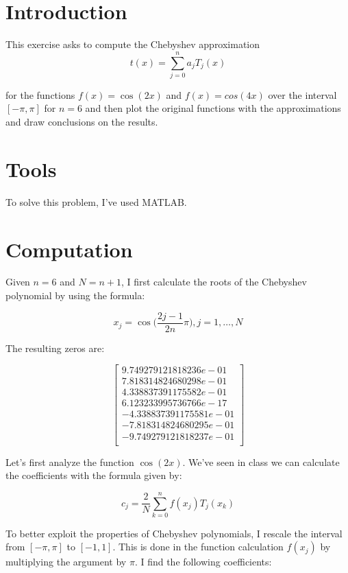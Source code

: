 \documentclass{article}
\begin{document}
\section{Introduction}\label{sec:intro}
This exercise asks to compute the Chebyshev approximation
$$t(x)=\sum^n_{j=0}{a_jT_j(x)}$$

for the functions $f(x)=\cos(2x)$ and $f(x)=cos(4x)$ over the interval $[-\pi,\pi]$ for $n = 6$ and then plot the original functions with the approximations and draw conclusions on the results.


\section{Tools}
To solve this problem, I've used MATLAB.

\section{Computation}
Given $n=6$ and $N=n+1$, I first calculate the roots of the Chebyshev polynomial by using the formula:

$$x_j=\cos \Big( \frac{2j-1}{2n}\pi \Big), j=1,\dots,N$$

The resulting zeros are:

$$
\begin{bmatrix} 
9.749279121818236e-01\\
7.818314824680298e-01\\
4.338837391175582e-01\\
6.123233995736766e-17\\
-4.338837391175581e-01\\
-7.818314824680295e-01\\
-9.749279121818237e-01\\
\end{bmatrix}
$$

Let's first analyze the function $\cos(2x)$. We've seen in class we can calculate the coefficients with the formula given by:

$$c_j=\frac{2}{N}\sum_{k=0}^{n}f(x_j)T_j(x_k)$$

To better exploit the properties of Chebyshev polynomials, I rescale the interval from $[-\pi,\pi]$ to $[-1,1]$. This is done in the function calculation $f(x_j)$ by multiplying the argument by $\pi$. I find the following coefficients:
\end{document}
